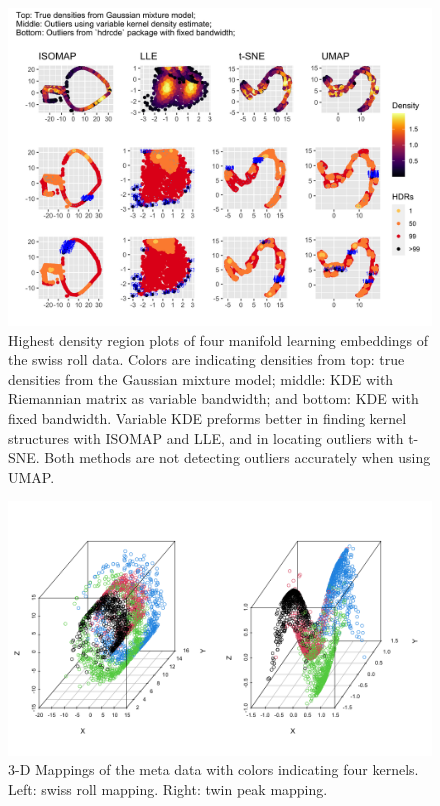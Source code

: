 \documentclass[11pt,a4paper,]{article}
\begin{document}
\begin{figure}

{\centering \includegraphics[width=0.95\linewidth]{figures/outliers_comparison_4ml_3cases} 

}

\caption{Highest density region plots of four manifold learning embeddings of the swiss roll data. Colors are indicating densities from top: true densities from the Gaussian mixture model; middle: KDE with Riemannian matrix as variable bandwidth; and bottom: KDE with fixed bandwidth. Variable KDE preforms better in finding kernel structures with ISOMAP and LLE, and in locating outliers with t-SNE. Both methods are not detecting outliers accurately when using UMAP.}\label{fig:sroutliers}
\end{figure}

\begin{figure}

{\centering \includegraphics[width=0.8\linewidth]{figures/mappings_sr_tp} 

}

\caption{3-D Mappings of the meta data with colors indicating four kernels. Left: swiss roll mapping. Right: twin peak mapping.}\label{fig:mappings}
\end{figure}
\end{document}
